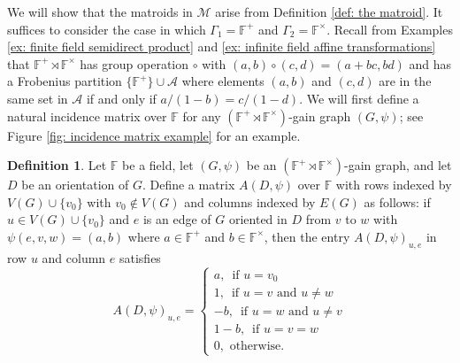 \documentclass[12pt]{article}
\theoremstyle{definition}
\newtheorem{definition}[theorem]{Definition}
\newcommand{\bF}{\mathbb F}
\newcommand{\cA}{\mathcal{A}}
\newcommand{\cM}{\mathcal{M}}
\begin{document}
We will show that the matroids in $\cM$ arise from Definition \ref{def: the matroid}.
It suffices to consider the case in which $\Gamma_1 = \bF^+$ and $\Gamma_2 = \bF^{\times}$.
Recall from Examples \ref{ex: finite field semidirect product} and \ref{ex: infinite field affine transformations} that $\bF^+ \rtimes \bF^{\times}$ has group operation $\circ$ with $(a,b) \circ (c,d) = (a + bc, bd)$ and has a Frobenius partition $\{\bF^+\} \cup \cA$ where elements $(a,b)$ and $(c,d)$ are in the same set in $\cA$ if and only if $a/(1 - b) = c/(1 - d)$.
We will first define a natural incidence matrix over $\bF$ for any $(\bF^+ \rtimes \bF^{\times})$-gain graph $(G, \psi)$; see Figure \ref{fig: incidence matrix example} for an example.

\begin{definition} \label{def: incidence matrix}
Let $\bF$ be a field, let $(G, \psi)$ be an $(\bF^{+} \rtimes \bF^{\times})$-gain graph, and let $D$ be an orientation of $G$.
Define a matrix $A(D, \psi)$ over $\bF$ with rows indexed by $V(G) \cup \{v_0\}$ with $v_0 \notin V(G)$ and columns indexed by $E(G)$ as follows: if $u \in V(G) \cup \{v_0\}$ and $e$ is an edge of $G$ oriented in $D$ from $v$ to $w$ with $\psi(e, v, w) = (a, b)$ where $a \in \bF^+$ and $b \in \bF^{\times}$, then the entry $A(D,\psi)_{u,e}$ in row $u$ and column $e$ satisfies
$$A(D, \psi)_{u,e} = 
\begin{cases}
    a, \, \textrm{ if $u = v_0$} \\
    1, \, \textrm{ if $u = v$ and $u \ne w$} \\
    -b, \, \textrm{ if $u = w$ and $u \ne v$} \\
    1 - b, \, \textrm{ if $u = v = w$} \\
    0, \textrm{ otherwise.}
\end{cases}
$$
\end{definition}
\end{document}
